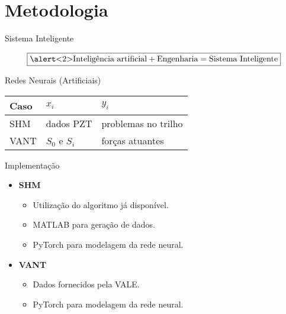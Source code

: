 \section{Metodologia}

\begin{frame}{Sistema Inteligente}

    \[\boxed{\text{\alert<2>{Inteligência artificial}} + \text{Engenharia} = \text{Sistema Inteligente}}\] 
\end{frame}

\begin{frame}{Redes Neurais (Artificiais)}
\pause
\begin{figure}
\centering

\end{figure}
\pause
\begin{table}
\centering
\begin{tabular}{|l|l|l|}
    \hline
    Caso & \(x_i\)           & \(y_i\)             \\ \hline
    SHM  & dados PZT         & \alert<4>{problemas no trilho} \\ \hline
    VANT & \(S_0\) e \(S_i\) & forças atuantes     \\ \hline
\end{tabular}
\end{table}
\end{frame}

\begin{frame}{Implementação}
\pause
\begin{itemize}
    \item \textbf{SHM}
        \begin{itemize}
            \item<3-4> Utilização do algoritmo já disponível.
            \item<3-4> MATLAB para geração de dados.
            \item<3-4> PyTorch para modelagem da rede neural.
        \end{itemize}
    \item \textbf{VANT}
    \begin{itemize}
        \item<4> Dados fornecidos pela VALE.
        \item<4> PyTorch para modelagem da rede neural.
    \end{itemize}
\end{itemize}
    
\end{frame}